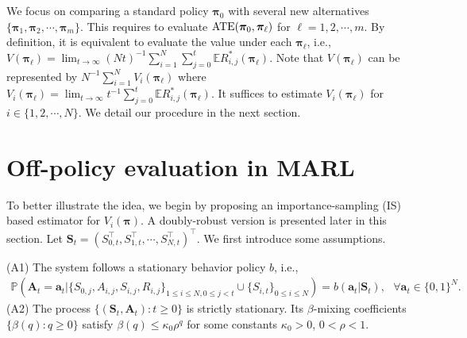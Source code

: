 \documentclass{article}
\newcommand{\Mean}{{\mathbb{E}}}
\newcommand{\prob}{{\mathbb{P}}}
\begin{document}
We focus on comparing a standard policy $\bm{\pi}_0$ with several new alternatives $\{\bm{\pi}_1,\bm{\pi}_2,\cdots,\bm{\pi}_m\}$. This requires to evaluate $\hbox{ATE}(\bm{\pi}_0,\bm{\pi}_\ell)$ for $\ell=1,2,\cdots,m$. By definition, it is equivalent to evaluate the value under each $\bm{\pi}_{\ell}$, i.e.,  $V(\bm{\pi}_{\ell})=\lim_{t\to \infty} (Nt)^{-1}\sum_{i=1}^N \sum_{j=0}^t \Mean R_{i,j}^*(\bm{\pi}_{\ell})$. Note that $V(\bm{\pi}_{\ell})$ can be represented by $N^{-1} \sum_{i=1}^N V_i(\bm{\pi}_{\ell})$ where $V_i(\bm{\pi}_{\ell})=\lim_{t\to \infty} t^{-1}\sum_{j=0}^t \Mean R_{i,j}^*(\bm{\pi}_{\ell})$. It suffices to estimate $V_i(\bm{\pi}_{\ell})$ for $i\in \{1,2,\cdots,N\}$. We detail our procedure in the next section. 


\vspace{-0.2cm}
\section{Off-policy evaluation in MARL}\label{sec:method}
To better illustrate the idea, we begin by proposing an importance-sampling (IS) based estimator for $V_i(\bm{\pi})$. A doubly-robust version is presented later in this section. Let $\bm{S}_t=(S_{0,t}^\top,S_{1,t}^\top,\cdots,S_{N,t}^\top)^\top$. 
We first introduce some assumptions. %

(A1) The system follows a stationary behavior policy $b$, i.e., %
\vspace{-0.1cm}
\begin{eqnarray*}
	\prob(\bm{A}_t=\bm{a}_t|\{S_{0,j},A_{i,j},S_{i,j},R_{i,j} \}_{1\le i\le N, 0\le j<t}\cup \{S_{i,t}\}_{0\le i\le N} )=b(\bm{a}_t|\bm{S}_t),\,\,\,\,\forall \bm{a}_t\in \{0,1\}^N.
\end{eqnarray*}
(A2) The process $\{(\bm{S}_t,\bm{A}_t):t\ge 0\}$ is strictly stationary. Its $\beta$-mixing coefficients $\{\beta(q):q\ge 0\}$ \citep[see e.g.,][for a detailed definition]{Bradley2005} satisfy $\beta(q)\le \kappa_0 \rho^{q}$ for some constants $\kappa_0>0$, $0<\rho<1$. 
\end{document}
